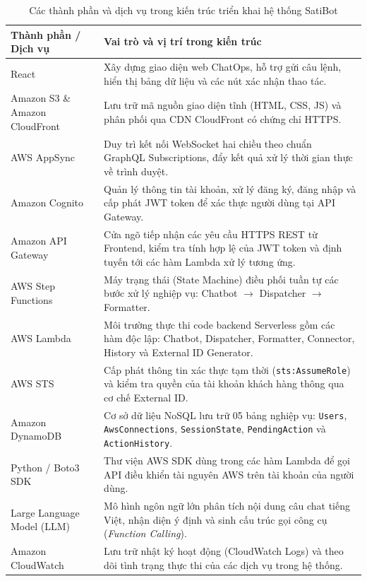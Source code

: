 \documentclass[a4paper,12pt]{article}
\newcommand{\bangfont}{\fontsize{12}{15}\selectfont}
\begin{document}
\begin{table}[H]
\centering
\caption{Các thành phần và dịch vụ trong kiến trúc triển khai hệ thống SatiBot}
\label{tab:kientruc}
\bangfont
\begin{tabularx}{\linewidth}{@{}p{4.8cm}Y@{}}
\toprule
\textbf{Thành phần / Dịch vụ} & \textbf{Vai trò và vị trí trong kiến trúc}\\
\midrule
React & Xây dựng giao diện web ChatOps, hỗ trợ gửi câu lệnh, hiển thị bảng dữ liệu và các nút xác nhận thao tác.\\
Amazon S3 \& Amazon CloudFront & Lưu trữ mã nguồn giao diện tĩnh (HTML, CSS, JS) và phân phối qua CDN CloudFront có chứng chỉ HTTPS.\\
AWS AppSync & Duy trì kết nối WebSocket hai chiều theo chuẩn GraphQL Subscriptions, đẩy kết quả xử lý thời gian thực về trình duyệt.\\
Amazon Cognito & Quản lý thông tin tài khoản, xử lý đăng ký, đăng nhập và cấp phát JWT token để xác thực người dùng tại API Gateway.\\
Amazon API Gateway & Cửa ngõ tiếp nhận các yêu cầu HTTPS REST từ Frontend, kiểm tra tính hợp lệ của JWT token và định tuyến tới các hàm Lambda xử lý tương ứng.\\
AWS Step Functions & Máy trạng thái (State Machine) điều phối tuần tự các bước xử lý nghiệp vụ: Chatbot $\rightarrow$ Dispatcher $\rightarrow$ Formatter.\\
AWS Lambda & Môi trường thực thi code backend Serverless gồm các hàm độc lập: Chatbot, Dispatcher, Formatter, Connector, History và External ID Generator.\\
AWS STS & Cấp phát thông tin xác thực tạm thời (\texttt{sts:AssumeRole}) và kiểm tra quyền của tài khoản khách hàng thông qua cơ chế External ID.\\
Amazon DynamoDB & Cơ sở dữ liệu NoSQL lưu trữ 05 bảng nghiệp vụ: \texttt{Users}, \texttt{AwsConnections}, \texttt{SessionState}, \texttt{PendingAction} và \texttt{ActionHistory}.\\
Python / Boto3 SDK & Thư viện AWS SDK dùng trong các hàm Lambda để gọi API điều khiển tài nguyên AWS trên tài khoản của người dùng.\\
Large Language Model (LLM) & Mô hình ngôn ngữ lớn phân tích nội dung câu chat tiếng Việt, nhận diện ý định và sinh cấu trúc gọi công cụ (\textit{Function Calling}).\\
Amazon CloudWatch & Lưu trữ nhật ký hoạt động (CloudWatch Logs) và theo dõi tình trạng thực thi của các dịch vụ trong hệ thống.\\
\bottomrule
\end{tabularx}
\end{table}
\end{document}
